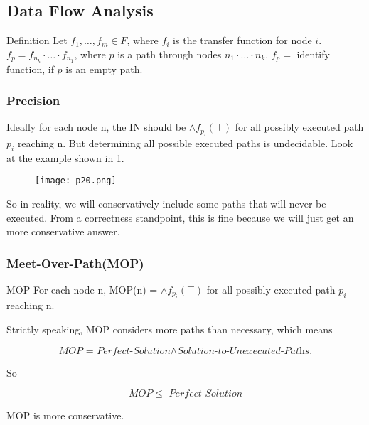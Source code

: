 \subsection{Data Flow Analysis}

\begin{definition}{Definition}
Let $f_1, \dots , f_m \in F$, where $f_i$ is the transfer function for node $i$. $f_p=f_{n_k} \cdot \ldots \cdot f_{n_1}$, where $p$ is a path through nodes $n_1  \cdot \ldots \cdot n_k$. $f_p =$ identify function, if $p$ is an empty path.
\end{definition}

\subsubsection{Precision}

Ideally for each node n, the IN should be $ \wedge f_{p_i}(\top)$ for all possibly executed path $p_i$ reaching n. But determining all possible executed paths is undecidable. Look at the example shown in \ref{fig:p20}.


\begin{figure}[h]
    \centering
    \texttt{[image: p20.png]}
    \caption{}
    \label{fig:p20}
\end{figure}

So in reality,  we will conservatively include some paths that will never be executed. From a correctness standpoint, this is fine because we will just get an more conservative answer.

\subsubsection{Meet-Over-Path(MOP)}

\begin{definition}{MOP}
For each node n, MOP(n) = $ \wedge f_{p_i}(\top)$ for all possibly executed path $p_i$ reaching n. 

Strictly speaking, MOP considers more paths than necessary, which means 

\[ \textit{MOP = Perfect-Solution} \wedge  \textit{Solution-to-Unexecuted-Paths.}\]

So 

\[ MOP \leq \textit{ Perfect-Solution} \]

MOP is more conservative. 

\end{definition}



